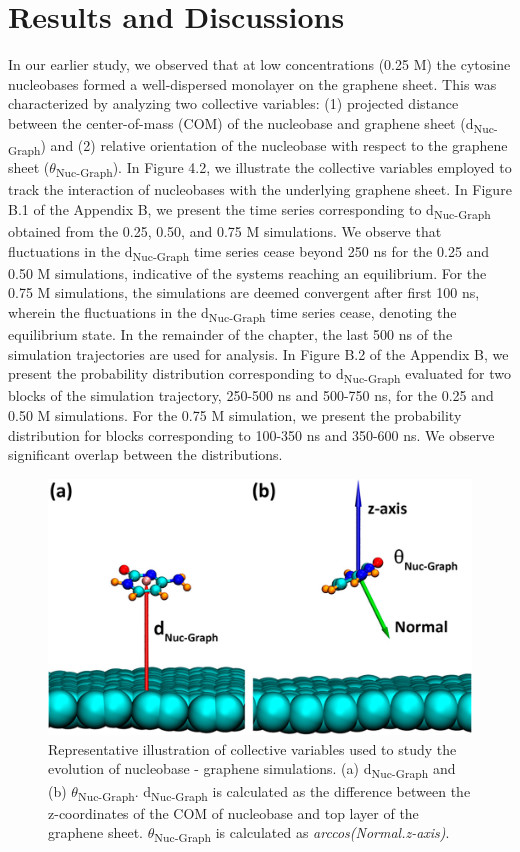 \section{Results and Discussions}
In our earlier study, we observed that at low concentrations (0.25 M) the cytosine nucleobases formed a well-dispersed monolayer on the graphene sheet. This was characterized by analyzing two collective variables: (1) projected distance between the center-of-mass (COM) of the nucleobase and graphene sheet (d\textsubscript{Nuc-Graph}) and (2) relative orientation of the nucleobase with respect to the graphene sheet ($\theta$\textsubscript{Nuc-Graph}). In Figure 4.2, we illustrate the collective variables employed to track the interaction of nucleobases with the underlying graphene sheet.
In Figure B.1 of the Appendix B, we present the time series corresponding to d\textsubscript{Nuc-Graph} obtained from the 0.25, 0.50, and 0.75 M simulations. We observe that fluctuations in the d\textsubscript{Nuc-Graph} time series cease beyond 250 ns for the 0.25 and 0.50 M simulations, indicative of the systems reaching an equilibrium. For the 0.75 M simulations, the simulations are deemed convergent after first 100 ns, wherein the fluctuations in the d\textsubscript{Nuc-Graph} time series cease, denoting the equilibrium state.  In the remainder of the chapter, the last 500 ns of the simulation trajectories are used for analysis. In Figure B.2 of the Appendix B, we present the probability distribution corresponding to d\textsubscript{Nuc-Graph} evaluated for two blocks of the simulation trajectory, 250-500 ns and 500-750 ns, for the 0.25 and 0.50 M simulations. For the 0.75 M simulation, we present the probability distribution for blocks corresponding to 100-350 ns and 350-600 ns. We observe significant overlap between the distributions.
\begin{figure}
    \centering
    \includegraphics{Chapter2/Figures/Figure1.png}
    \caption[Representative illustration of collective variables used to study the evolution of nucleobase - graphene simulations]{Representative illustration of collective variables used to study the evolution of nucleobase - graphene simulations. (a) d\textsubscript{Nuc-Graph} and (b) $\theta$\textsubscript{Nuc-Graph}. d\textsubscript{Nuc-Graph} is calculated as the difference between the z-coordinates of the COM of nucleobase and top layer of the graphene sheet. $\theta$\textsubscript{Nuc-Graph} is calculated as \textit{arccos(Normal.z-axis)}.}
\end{figure}

